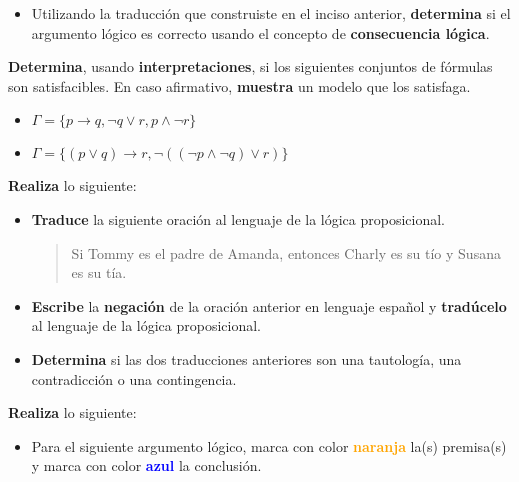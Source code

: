 \documentclass[oneside]{style}
\begin{document}
\begin{questions}[label=\protect\circled{\bfseries\arabic*}]
{\begin{itemize}
            \item Utilizando la traducción que construiste en el inciso anterior, 
            \textbf{determina} si el argumento lógico es correcto usando el 
            concepto de \textbf{consecuencia lógica}.
        \end{itemize}
    }

    \question
    {
        \textbf{Determina}, usando \textbf{interpretaciones}, si los siguientes 
        conjuntos de fórmulas son satisfacibles. En caso afirmativo, 
        \textbf{muestra} un modelo que los satisfaga.
        \begin{itemize}
            \item $\Gamma = \{p \rightarrow q, \neg q \lor r, p \land \neg r\}$
            \item $\Gamma = \{(p \lor q) \rightarrow r, \neg((\neg p \land 
            \neg q) \lor r)\}$
        \end{itemize}
    }

    \question
    {
        \textbf{Realiza} lo siguiente:
        \begin{itemize}
            \item \textbf{Traduce} la siguiente oración al lenguaje de la 
            lógica proposicional. 

            \begin{quote}
                \centering
                Si Tommy es el padre de Amanda, entonces Charly es su tío y 
                Susana es su tía. 
            \end{quote}

            \item \textbf{Escribe} la \textbf{negación} de la oración anterior 
            en lenguaje español y \textbf{tradúcelo} al lenguaje de la lógica 
            proposicional.

            \item \textbf{Determina} si las dos traducciones anteriores son 
            una tautología, una contradicción o una contingencia. 
        \end{itemize}
    }

    \question
    {

        \textbf{Realiza} lo siguiente:
        \begin{itemize}
            \item Para el siguiente argumento lógico, marca con color 
            \textcolor{orange}{\textbf{naranja}} la(s) premisa(s) y marca con 
            color \textcolor{blue}{\textbf{azul}} la conclusión.


\end{itemize}}
\end{questions}
\end{document}
